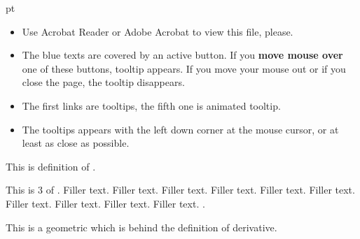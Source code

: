 \documentclass{article}
\def\Message#1{\colorbox{bkg}{
      \begin{minipage}{1\linewidth}
        \smallskip
      #1
        \smallskip
      \end{minipage}
 }}
\begin{document}
 pt

\Message{
\begin{itemize}
\item Use Acrobat Reader or Adobe Acrobat to view this file, please.
\item The blue texts are covered by an active button. If you \textbf{move mouse over} one of
  these buttons, tooltip appears. If you move your mouse out or if you
  close the page, the tooltip disappears.
\item The first links are tooltips, the fifth one is animated tooltip.
\item The tooltips appears with the left down corner at the mouse
  cursor, or at least as close as possible. 
\end{itemize}
}

\begin{definition}
  This is definition of  . 
\end{definition}


\begin{definition}
  This is 3 of . Filler
  text. Filler text. Filler text. Filler text. Filler text. Filler text. Filler text. Filler text. Filler text. Filler text.
  .
\end{definition}


This is a geometric  which is behind the
definition of derivative.
\end{document}
